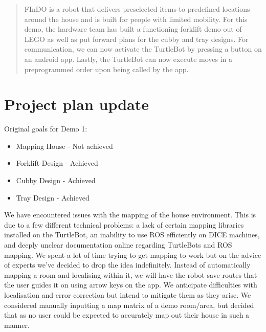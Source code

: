 \documentclass{article}
\begin{document}
 



\begin{abstract} 
FInDO is a robot that delivers preselected items to predefined locations around the house and is built for people with limited mobility. For this demo, the hardware team has built a functioning forklift demo out of LEGO as well as put forward plans for the cubby and tray designs. For communication, we can now activate the TurtleBot by pressing a button on an android app. Lastly, the TurtleBot can now execute moves in a preprogrammed order upon being called by the app.
\end{abstract} 


\section{Project plan update} 
Original goals for Demo 1:
\begin{itemize}
    \item Mapping House - Not achieved
    \item Forklift Design - Achieved 
    \item Cubby Design - Achieved
    \item Tray Design - Achieved
\end{itemize}

We have encountered issues with the mapping of the house environment. This is due to a few different technical problems: a lack of certain mapping libraries installed on the TurtleBot, an inability to use ROS efficiently on DICE machines, and deeply unclear documentation online regarding TurtleBots and ROS mapping. We spent a lot of time trying to get mapping to work but on the advice of experts we've decided to drop the idea indefinitely.
Instead of automatically mapping a room and localising within it, we will have the robot save routes that the user guides it on using arrow keys on the app. We anticipate difficulties with localisation and error correction but intend to mitigate them as they arise. We considered manually inputting a map matrix of a demo room/area, but decided that as no user could be expected to accurately map out their house in such a manner.

\end{document}

